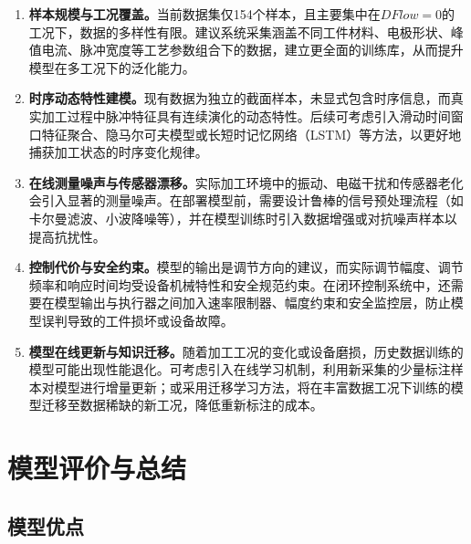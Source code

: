\documentclass[UTF8,a4paper,12pt]{ctexart}
\begin{document}
\begin{enumerate}[label=(\arabic*),leftmargin=2em]
\item \textbf{样本规模与工况覆盖。}当前数据集仅154个样本，且主要集中在$DFlow=0$的工况下，数据的多样性有限。建议系统采集涵盖不同工件材料、电极形状、峰值电流、脉冲宽度等工艺参数组合下的数据，建立更全面的训练库，从而提升模型在多工况下的泛化能力。

\item \textbf{时序动态特性建模。}现有数据为独立的截面样本，未显式包含时序信息，而真实加工过程中脉冲特征具有连续演化的动态特性。后续可考虑引入滑动时间窗口特征聚合、隐马尔可夫模型或长短时记忆网络（LSTM）等方法，以更好地捕获加工状态的时序变化规律。

\item \textbf{在线测量噪声与传感器漂移。}实际加工环境中的振动、电磁干扰和传感器老化会引入显著的测量噪声。在部署模型前，需要设计鲁棒的信号预处理流程（如卡尔曼滤波、小波降噪等），并在模型训练时引入数据增强或对抗噪声样本以提高抗扰性。

\item \textbf{控制代价与安全约束。}模型的输出是调节方向的建议，而实际调节幅度、调节频率和响应时间均受设备机械特性和安全规范约束。在闭环控制系统中，还需要在模型输出与执行器之间加入速率限制器、幅度约束和安全监控层，防止模型误判导致的工件损坏或设备故障。

\item \textbf{模型在线更新与知识迁移。}随着加工工况的变化或设备磨损，历史数据训练的模型可能出现性能退化。可考虑引入在线学习机制，利用新采集的少量标注样本对模型进行增量更新；或采用迁移学习方法，将在丰富数据工况下训练的模型迁移至数据稀缺的新工况，降低重新标注的成本。
\end{enumerate}

\section{模型评价与总结}

\subsection{模型优点}
\end{document}
